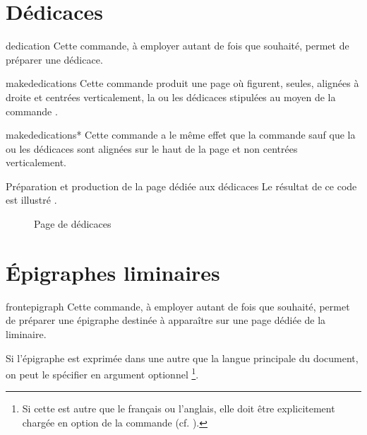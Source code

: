 \section{Dédicaces}

\begin{docCommand}{dedication}{}
  Cette commande, à employer autant de fois que
  souhaité\hauteurpage{}, permet de préparer une dédicace.
\end{docCommand}

\begin{docCommand}{makededications}{}
  Cette commande produit une page où figurent, seules, alignées à droite et
  centrées verticalement, la ou les dédicaces stipulées au moyen de la commande
  .
\end{docCommand}
%
\begin{docCommand}{makededications*}{}
  Cette commande a le même effet que la commande  sauf
  que la ou les dédicaces sont alignées sur le haut de la page et non centrées
  verticalement.
\end{docCommand}

\begin{dbexample}{Préparation et production de la page dédiée aux dédicaces}{}
  \NoAutoSpacing%
  Le résultat de ce code est illustré .
\end{dbexample}

\begin{figure}[htbp]
  \centering
  \caption{Page de dédicaces}
  \label{fig-dedicationspage}
\end{figure}

\section{Épigraphes liminaires}

\begin{docCommand}{frontepigraph}{}
  Cette commande, à employer autant de fois que souhaité\hauteurpage{}, permet
  de préparer une épigraphe destinée à apparaître sur une page dédiée de la
  \gls{liminaire}.

  Si l'épigraphe est exprimée dans une   autre que la langue principale du document, on peut le
  spécifier en argument optionnel%
  \footnote{Si cette  est autre que le français ou l'anglais, elle
    doit être explicitement chargée en option de la commande
     (cf.  ).}.
\end{docCommand}


